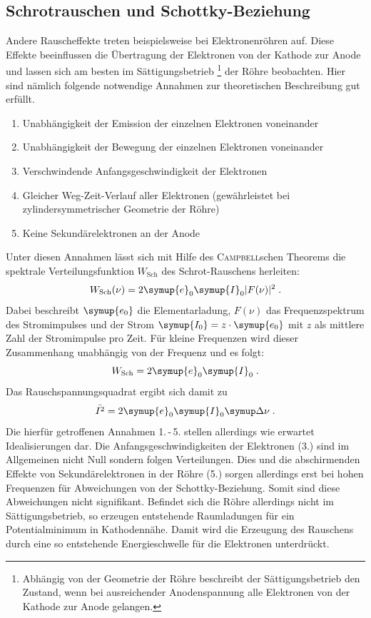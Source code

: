 \subsection{Schrotrauschen und Schottky-Beziehung}
%
Andere Rauscheffekte treten beispielsweise bei Elektronenröhren auf. Diese Effekte beeinflussen die Übertragung der Elektronen von der Kathode zur Anode und lassen sich am besten im Sättigungsbetrieb \footnote{Abhängig von der Geometrie der Röhre beschreibt der Sättigungsbetrieb den Zustand, wenn bei ausreichender Anodenspannung alle Elektronen von der Kathode zur Anode gelangen.} der Röhre beobachten. Hier sind nämlich folgende notwendige Annahmen zur theoretischen Beschreibung gut erfüllt.
%
\begin{enumerate}
  \item Unabhängigkeit der Emission der einzelnen Elektronen voneinander
  \item Unabhängigkeit der Bewegung der einzelnen Elektronen voneinander
  \item Verschwindende Anfangsgeschwindigkeit der Elektronen
  \item Gleicher Weg-Zeit-Verlauf aller Elektronen (gewährleistet bei zylindersymmetrischer Geometrie der Röhre)
  \item Keine Sekundärelektronen an der Anode
\end{enumerate}
%
Unter diesen Annahmen lässt sich mit Hilfe des \textsc{Campbell}schen Theorems die spektrale Verteilungsfunktion $W_\text{Sch}$ des Schrot-Rauschens herleiten:
%
\begin{equation}
  W_\text{Sch}(\nu)=2\symup{e}_0\symup{I}_0|F(\nu)|^2 \; .
\end{equation}
%
Dabei beschreibt $\symup{e_0}$ die Elementarladung, $F(\nu)$ das Frequenzspektrum des Stromimpulses und der Strom $\symup{I_0}=z\cdot \symup{e_0}$ mit $z$ als mittlere Zahl der Stromimpulse pro Zeit. Für kleine Frequenzen wird dieser Zusammenhang unabhängig von der Frequenz und es folgt:
%
\begin{equation}
  W_\text{Sch}=2\symup{e}_0\symup{I}_0 \; .
\end{equation}
%
Das Rauschspannungsquadrat ergibt sich damit zu
%
\begin{equation}
  \bar{I^2}=2\symup{e}_0\symup{I}_0\upD\nu \; .
\end{equation}
%
Die hierfür getroffenen Annahmen 1.\,-\,5. stellen allerdings wie erwartet Idealisierungen dar. Die Anfangsgeschwindigkeiten der Elektronen (3.) sind im Allgemeinen nicht Null sondern folgen Verteilungen. Dies und die abschirmenden Effekte von Sekundärelektronen in der Röhre (5.) sorgen allerdings erst bei hohen Frequenzen für Abweichungen von der Schottky-Beziehung. Somit sind diese Abweichungen nicht signifikant. Befindet sich die Röhre allerdings nicht im Sättigungsbetrieb, so erzeugen entstehende Raumladungen für ein Potentialminimum in Kathodennähe. Damit wird die Erzeugung des Rauschens durch eine so entstehende Energieschwelle für die Elektronen unterdrückt.


